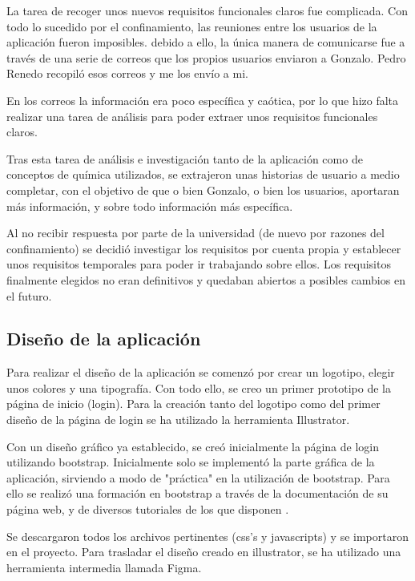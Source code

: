 La tarea de recoger unos nuevos requisitos funcionales claros fue complicada. Con todo lo sucedido por el confinamiento, las reuniones entre los usuarios de la aplicación fueron imposibles. debido a ello, la única manera de comunicarse fue a través de una serie de correos que los propios usuarios enviaron a Gonzalo. Pedro Renedo recopiló esos correos y me los envío a mi.

En los correos la información era poco específica y caótica, por lo que hizo falta realizar una tarea de análisis para poder extraer unos requisitos funcionales claros. 

Tras esta tarea de análisis e investigación tanto de la aplicación como de conceptos de química utilizados, se extrajeron unas historias de usuario a medio completar, con el objetivo de que o bien Gonzalo, o bien los usuarios, aportaran más información, y sobre todo información más específica. 

Al no recibir respuesta por parte de la universidad (de nuevo por razones del confinamiento) se decidió investigar los requisitos por cuenta propia y establecer unos requisitos temporales para poder ir trabajando sobre ellos. Los requisitos finalmente elegidos no eran definitivos y quedaban abiertos a posibles cambios en el futuro.


\subsection{Diseño de la aplicación}

Para realizar el diseño de la aplicación se comenzó por crear un logotipo, elegir unos colores y una tipografía. Con todo ello, se creo un primer prototipo de la página de inicio (login). Para la creación tanto del logotipo como del primer diseño de la página de login se ha utilizado la herramienta Illustrator. 

Con un diseño gráfico ya establecido, se creó inicialmente la página de login utilizando bootstrap. Inicialmente solo se implementó la parte gráfica de la aplicación, sirviendo a modo de "práctica" en la utilización de bootstrap. Para ello se realizó una formación en bootstrap a través de la documentación de su página web, y de diversos tutoriales de los que disponen \cite{doc:Bootstrap4}.

Se descargaron todos los archivos pertinentes (css's y javascripts) y se importaron en el proyecto. Para trasladar el diseño creado en illustrator, se ha utilizado una herramienta intermedia llamada Figma.

